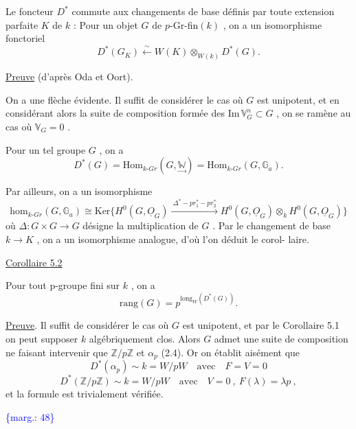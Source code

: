 \documentclass[11pt]{article}
\newcommand{\scanpage}[1]{\par\bigskip\noindent{\small\sffamily[scan #1]}\par}
\newcommand{\mspage}[1]{{\small\sffamily[p.\,#1]}}
\newcommand{\hand}[1]{\textcolor{blue}{#1}}
\newcommand{\margin}[1]{\textcolor{blue}{\{\textsf{marg.:} #1\}}}
\newcommand{\uline}[1]{\underline{#1}}
\begin{document}
Le foncteur $D^*$ commute aux changements de base définis par
toute extension parfaite $K$ de $k$ : Pour un objet $G$ de $p$-Gr-fin$(k)$ ,
on a un isomorphisme fonctoriel
\[
D^*(G_{K}) \overset{\sim}{\leftarrow} W(K) \otimes_{W(k)} D^*(G) .
\]

\mspage{\hand{47}}

\clearpage
\scanpage{129/48}
\mspage{\hand{II 20}}

\uline{Preuve} (d'après Oda et Oort).

On a une flèche évidente. Il suffit de considérer le cas où
$G$ est unipotent, et en considérant alors la suite de composition formée
des $\mathrm{Im}\,\mathbb{V}^n_G \subset G$ , on se ramène au cas où $\mathbb{V}_G = 0$ .

Pour un tel groupe $G$ , on a
\[ D^*(G) = \mathrm{Hom}_{k\text{-}Gr}(G,\underset{\to}{\mathbb{W}}) = \mathrm{Hom}_{k\text{-}Gr}(G,\mathbb{G}_a) . \]

Par ailleurs, on a un isomorphisme
\[ \mathrm{hom}_{k\text{-}Gr}(G,\mathbb{G}_a) \cong \mathrm{Ker}\{H^0(G,\underline{O}_G) \xrightarrow{\ \Delta^*-pr_1^*-pr_2^*\ } H^0(G,\underline{O}_G) \otimes_k H^0(G,\underline{O}_G)\} \]
où $\Delta : G \times G \to G$ désigne la multiplication de $G$ . Par le changement de
base $k \to K$ , on a un isomorphisme analogue, d'où l'on déduit le corol-%
laire.

\uline{Corollaire 5.2}

Pour tout p-groupe fini sur $k$ , on a
\[ \mathrm{rang}(G) = p^{\mathrm{long}_W(D^*(G))} . \]

\uline{Preuve}. Il suffit de considérer le cas où $G$ est unipotent, et par le
Corollaire 5.1 on peut supposer $k$ algébriquement clos. Alors $G$ admet
une suite de composition ne faisant intervenir que $\mathbb{Z}/p\mathbb{Z}$ et $\alpha_p$ (2.4).
Or on établit aisément que
\[ D^*(\alpha_p) \sim k = W/pW \quad \text{avec} \quad F = V = 0 \]
\[ D^*(\mathbb{Z}/p\mathbb{Z}) \sim k = W/pW \quad \text{avec} \quad V = 0 \ , \ F(\lambda) = \lambda p \ , \]
et la formule est trivialement vérifiée.

\margin{48}

\clearpage
\scanpage{129/49}
\mspage{\hand{II 21}}
\end{document}
